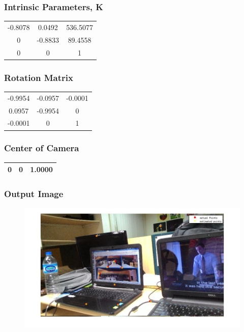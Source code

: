 \documentclass[12pt]{article}
\begin{document}
               
\subsubsection{Intrinsic Parameters, K}
\begin{tabular}{|c|c|c|}
\hline

 -0.8078 &  0.0492 &  536.5077 \\
 0 &  -0.8833 &  89.4558 \\
 0 &  0 &  1 \\
\hline
\end{tabular}
     
        
\subsubsection{Rotation Matrix}
\begin{tabular}{|c|c|c|}
\hline
-0.9954 &  -0.0957 &  -0.0001 \\
 0.0957 &  -0.9954 &  0 \\
 -0.0001 &  0 &  1 \\
\hline
\end{tabular}
             

\subsubsection{Center of Camera}
\begin{tabular}{|c|c|c|}
\hline

 0  &  0 &  1.0000 \\ 
  \hline
\end{tabular}



\subsubsection{Output Image}

\begin{figure}[htp]
\centering
\begin{minipage}{1.0\textwidth}
\includegraphics[width=1.3\textwidth]{ransacPtmanual.jpg}\hfill
\end{minipage}
\end{figure}
\clearpage
 
\end{document}
